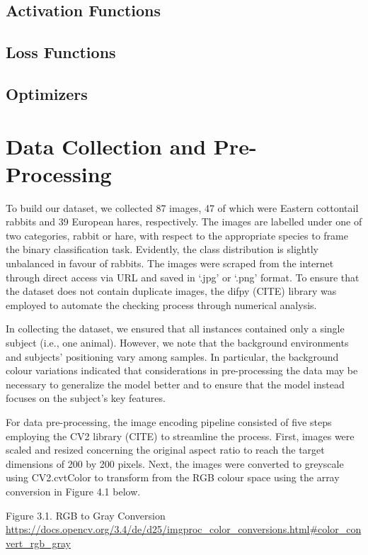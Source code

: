 \documentclass{article}
\begin{document}
\subsection{Activation Functions}
\subsection{Loss Functions}
\subsection{Optimizers}

\section{Data Collection and Pre-Processing}
To build our dataset, we collected 87 images, 47 of which were Eastern cottontail rabbits and 39 European hares, respectively. The images are labelled under one of two categories, rabbit or hare, with respect to the appropriate species to frame the binary classification task. Evidently, the class distribution is slightly unbalanced in favour of rabbits. The images were scraped from the internet through direct access via URL and saved in ‘.jpg’ or ‘.png’ format. To ensure that the dataset does not contain duplicate images, the difpy (CITE) library was employed to automate the checking process through numerical analysis. 

In collecting the dataset, we ensured that all instances contained only a single subject (i.e., one animal). However, we note that the background environments and subjects’ positioning vary among samples. In particular, the background colour variations indicated that considerations in pre-processing the data may be necessary to generalize the model better and to ensure that the model instead focuses on the subject’s key features. 

For data pre-processing, the image encoding pipeline consisted of five steps employing the CV2 library (CITE) to streamline the process. First, images were scaled and resized concerning the original aspect ratio to reach the target dimensions of 200 by 200 pixels. Next, the images were converted to greyscale using CV2.cvtColor to transform from the RGB colour space using the array conversion in Figure 4.1 below. 


Figure 3.1. RGB to Gray Conversion \url{https://docs.opencv.org/3.4/de/d25/imgproc_color_conversions.html#color_convert_rgb_gray}
\end{document}
